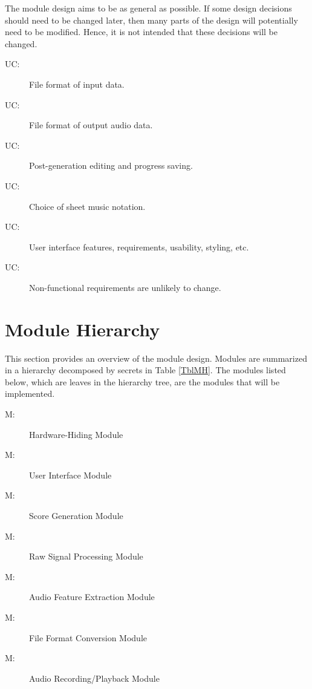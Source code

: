 \documentclass[12pt, titlepage]{article}
\newcounter{ucnum}
\newcommand{\uctheucnum}{UC\theucnum}
\newcounter{mnum}
\newcommand{\mthemnum}{M\themnum}
\begin{document}
The module design aims to be as general as possible. If some design decisions
should need to be changed later, then many parts of the design
will potentially need to be modified. Hence, it is not intended that these
decisions will be changed.

\begin{description}
  \item[ \uctheucnum \label{ucInputFormat}:] File format of input data.
  \item[ \uctheucnum \label{ucOutputFormat}:] File format of output audio data.
  \item[ \uctheucnum \label{ucEditing}:] Post-generation editing and progress saving.
  \item[ \uctheucnum \label{ucNotation}:] Choice of sheet music notation.
  \item[ \uctheucnum \label{ucUI}:] User interface features, requirements, usability, styling, etc.
  \item[ \uctheucnum \label{nfrStability}:] Non-functional requirements are unlikely to change.
\end{description}

\section{Module Hierarchy} \label{SecMH}

This section provides an overview of the module design. Modules are summarized
in a hierarchy decomposed by secrets in Table \ref{TblMH}. The modules listed
below, which are leaves in the hierarchy tree, are the modules that will
be implemented.

\begin{description}
\item [ \mthemnum \label{mHH}:] Hardware-Hiding Module
\item [ \mthemnum \label{mUI}:] User Interface Module
\item [ \mthemnum \label{mSG}:] Score Generation Module
\item [ \mthemnum \label{mRSM}:] Raw Signal Processing Module
\item [ \mthemnum \label{mAFE}:] Audio Feature Extraction Module
\item [ \mthemnum \label{mFFC}:] File Format Conversion Module
\item [ \mthemnum \label{mARP}:] Audio Recording/Playback Module
\end{description}
\end{document}
